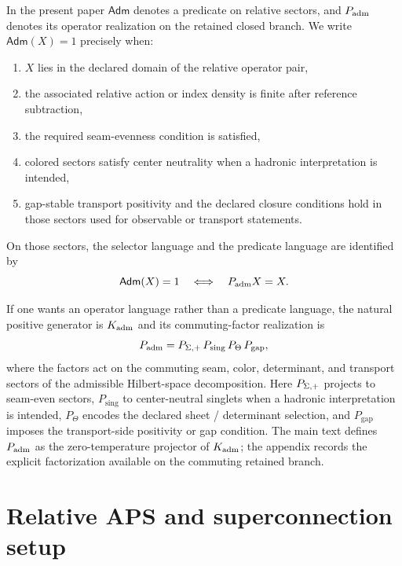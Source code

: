 \begin{definition}
In the present paper $\mathsf{Adm}$ denotes a predicate on relative sectors, and $P_{\mathrm{adm}}$ denotes its operator realization on the retained closed branch. We write $\mathsf{Adm}(X)=1$ precisely when:
\begin{enumerate}[label=(\arabic*), leftmargin=1.5em, topsep=3pt, itemsep=2pt]
    \item $X$ lies in the declared domain of the relative operator pair,
    \item the associated relative action or index density is finite after reference subtraction,
    \item the required seam-evenness condition is satisfied,
    \item colored sectors satisfy center neutrality when a hadronic interpretation is intended,
    \item gap-stable transport positivity and the declared closure conditions hold in those sectors used for observable or transport statements.
\end{enumerate}
On those sectors, the selector language and the predicate language are identified by
\[
\mathsf{Adm}(X)=1
\quad\Longleftrightarrow\quad
P_{\mathrm{adm}} X=X.
\]
\end{definition}

\begin{remark}
If one wants an operator language rather than a predicate language, the natural positive generator is $K_{\mathrm{adm}}$ and its commuting-factor realization is
\[
P_{\mathrm{adm}}=P_{\Sigma,+}\,P_{\mathrm{sing}}\,P_{\Theta}\,P_{\mathrm{gap}},
\]
where the factors act on the commuting seam, color, determinant, and transport sectors of the admissible Hilbert-space decomposition. Here $P_{\Sigma,+}$ projects to seam-even sectors, $P_{\mathrm{sing}}$ to center-neutral singlets when a hadronic interpretation is intended, $P_{\Theta}$ encodes the declared sheet / determinant selection, and $P_{\mathrm{gap}}$ imposes the transport-side positivity or gap condition. The main text defines $P_{\mathrm{adm}}$ as the zero-temperature projector of $K_{\mathrm{adm}}$; the appendix records the explicit factorization available on the commuting retained branch.
\end{remark}


\section{Relative APS and superconnection setup}
\label{app:aps}

